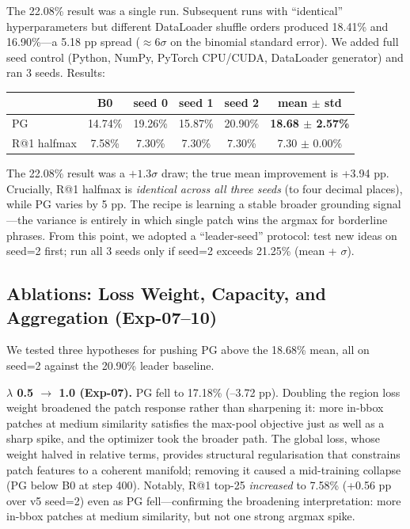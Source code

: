 \documentclass{article}
\begin{document}
The 22.08\% result was a single run. Subsequent runs with ``identical''
hyperparameters but different DataLoader shuffle orders produced 18.41\% and
16.90\%---a 5.18 pp spread ($\approx 6\sigma$ on the binomial standard error).
We added full seed control (Python, NumPy, PyTorch CPU/CUDA, DataLoader
generator) and ran 3 seeds. Results:

\begin{center}
\begin{tabular}{lccccc}
\toprule
 & B0 & seed 0 & seed 1 & seed 2 & mean $\pm$ std \\
\midrule
PG & 14.74\% & 19.26\% & 15.87\% & 20.90\% & \textbf{18.68 $\pm$ 2.57\%} \\
R@1 halfmax & 7.58\% & 7.30\% & 7.30\% & 7.30\% & 7.30 $\pm$ 0.00\% \\
\bottomrule
\end{tabular}
\end{center}

The 22.08\% result was a $+1.3\sigma$ draw; the true mean improvement is
+3.94 pp. Crucially, R@1 halfmax is \emph{identical across all three seeds}
(to four decimal places), while PG varies by 5 pp. The recipe is learning a
stable broader grounding signal---the variance is entirely in which single
patch wins the argmax for borderline phrases. From this point, we adopted a
``leader-seed'' protocol: test new ideas on seed=2 first; run all 3 seeds only
if seed=2 exceeds 21.25\% (mean + $\sigma$).

\subsection{Ablations: Loss Weight, Capacity, and Aggregation (Exp-07--10)}
\label{sec:ablations}

We tested three hypotheses for pushing PG above the 18.68\% mean, all on
seed=2 against the 20.90\% leader baseline.

\textbf{$\lambda$ 0.5 $\to$ 1.0 (Exp-07).} PG fell to 17.18\% (--3.72 pp).
Doubling the region loss weight broadened the patch response rather than
sharpening it: more in-bbox patches at medium similarity satisfies the max-pool
objective just as well as a sharp spike, and the optimizer took the broader
path. The global loss, whose weight halved in relative terms, provides
structural regularisation that constrains patch features to a coherent
manifold; removing it caused a mid-training collapse (PG below B0 at step 400).
Notably, R@1 top-25 \emph{increased} to 7.58\% (+0.56 pp over v5 seed=2)
even as PG fell---confirming the broadening interpretation: more in-bbox
patches at medium similarity, but not one strong argmax spike.
\end{document}
